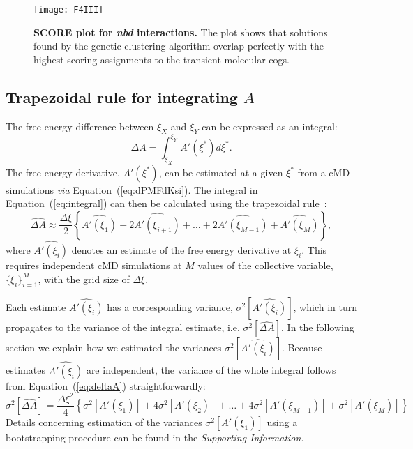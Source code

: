 \begin{figure}[H]
 \centering
\texttt{[image: F4III]}
\caption{
{\bf SCORE plot for \emph{nbd} interactions.}
The plot shows that solutions found by the genetic clustering algorithm overlap perfectly with the highest scoring assignments to the transient molecular cogs.
}
\label{fig:scoring}
\end{figure}

\subsection*{Trapezoidal rule for integrating $A$}
The free energy difference between $\xi_X$ and $\xi_Y$ can be expressed as an integral:
\begin{equation}\label{eq:integral}
 \Delta A = \int_{\xi_X}^{\xi_Y}A'(\xi^*)d\xi^*.
\end{equation}
The free energy derivative, $A'(\xi^*)$, can be estimated at a given $\xi^*$ from a cMD simulations \emph{via} Equation~(\ref{eq:dPMFdKsi}).
The integral in Equation~(\ref{eq:integral}) can then be calculated using the trapezoidal rule~\cite{press2007numerical}:
\begin{equation}\label{eq:deltaA}
\widehat{\Delta A} \approx \frac{\Delta\xi}{2}\left\{ \widehat{A'(\xi_1)} + 2\widehat{A'(\xi_{i+1})}+\ldots+2\widehat{A'(\xi_{M-1})}+\widehat{A'(\xi_M)} \right\},
\end{equation}
where $\widehat{A'(\xi_i)}$ denotes an estimate of the free energy derivative at $\xi_i$.
This requires independent cMD simulations at $M$ values of the collective variable, $\{ \xi_i\}_{i=1}^M$, with the grid size of $\Delta\xi$.

Each estimate $\widehat{A'(\xi_i)}$ has a corresponding variance, $\sigma^2[\widehat{A'(\xi_i)}]$, which in turn propagates to the variance of the integral estimate, i.e. $\sigma^2[\widehat{\Delta A}]$.
In the following section we explain how we estimated the variances $\sigma^2[\widehat{A'(\xi_i)}]$.
Because estimates $\widehat{A'(\xi_i)}$ are independent, the variance of the whole integral follows from Equation~(\ref{eq:deltaA}) straightforwardly:
\begin{equation}\label{eq:varDeltaA}
 \sigma^2[\widehat{\Delta A}] = \frac{\Delta\xi^2}{4}\left\{ \sigma^2[A'(\xi_1)] + 4\sigma^2[A'(\xi_2)]+\ldots+4\sigma^2[A'(\xi_{M-1})]+\sigma^2[A'(\xi_M)] \right\}
\end{equation}
{\color{black}Details concerning estimation of the variances $\sigma^2[A'(\xi_1)]$ using a bootstrapping procedure can be found in the \emph{Supporting Information}.}

